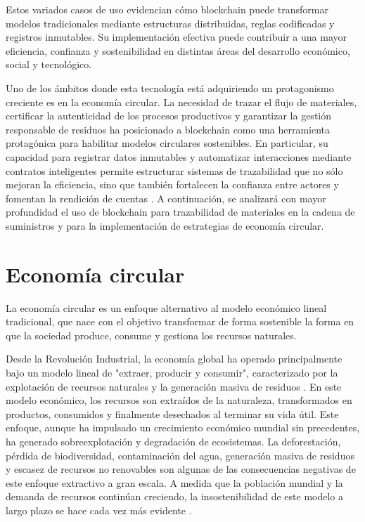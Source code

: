 Estos variados casos de uso evidencian cómo blockchain puede transformar modelos tradicionales mediante estructuras distribuidas, reglas codificadas y registros inmutables. Su implementación efectiva puede contribuir a una mayor eficiencia, confianza y sostenibilidad en distintas áreas del desarrollo económico, social y tecnológico.

Uno de los ámbitos donde esta tecnología está adquiriendo un protagonismo creciente es en la economía circular. La necesidad de trazar el flujo de materiales, certificar la autenticidad de los procesos productivos y garantizar la gestión responsable de residuos ha posicionado a blockchain como una herramienta protagónica para habilitar modelos circulares sostenibles. En particular, su capacidad para registrar datos inmutables y automatizar interacciones mediante contratos inteligentes permite estructurar sistemas de trazabilidad que no sólo mejoran la eficiencia, sino que también fortalecen la confianza entre actores y fomentan la rendición de cuentas \cite{sharabati2024blockchain, rejeb2023role}. A continuación, se analizará con mayor profundidad el uso de blockchain para trazabilidad de materiales en la cadena de suministros y para la implementación de estrategias de economía circular.

\section{Economía circular}

La economía circular es un enfoque alternativo al modelo económico lineal tradicional, que nace con el objetivo transformar de forma sostenible la forma en que la sociedad produce, consume y gestiona los recursos naturales.

Desde la Revolución Industrial, la economía global ha operado principalmente bajo un modelo lineal de "extraer, producir y consumir", caracterizado por la explotación de recursos naturales y la generación masiva de residuos \cite{cerda2016economia}. En este modelo económico, los recursos son extraídos de la naturaleza, transformados en productos, consumidos y finalmente desechados al terminar su vida útil. Este enfoque, aunque ha impulsado un crecimiento económico mundial sin precedentes, ha generado sobreexplotación y degradación de ecosistemas. La deforestación, pérdida de biodiversidad, contaminación del agua, generación masiva de residuos y escasez de recursos no renovables son algunas de las consecuencias negativas de este enfoque extractivo a gran escala. A medida que la población mundial y la demanda de recursos continúan creciendo, la insostenibilidad de este modelo a largo plazo se hace cada vez más evidente \cite{clima2022book}.

